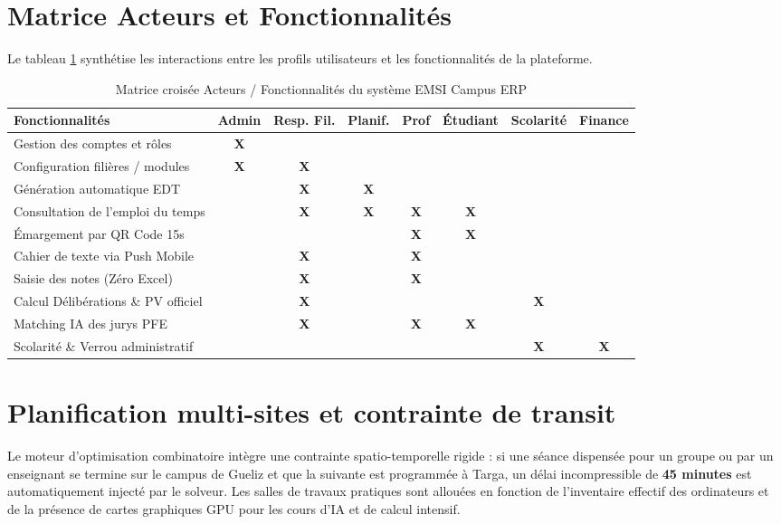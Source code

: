 \documentclass[11pt,a4paper]{report}
\begin{document}
\section{Matrice Acteurs et Fonctionnalités}
Le tableau \ref{tab:acteurs_fonctions} synthétise les interactions entre les profils utilisateurs et les fonctionnalités de la plateforme.

\begin{table}[h!]
\centering
\small
\renewcommand{\arraystretch}{1.3}
\begin{tabularx}{\textwidth}{|X|c|c|c|c|c|c|c|}
\hline
\rowcolor{tableheader}
\textbf{Fonctionnalités} & \textbf{Admin} & \textbf{Resp. Fil.} & \textbf{Planif.} & \textbf{Prof} & \textbf{Étudiant} & \textbf{Scolarité} & \textbf{Finance} \\
\hline
Gestion des comptes et rôles & \textbf{X} & & & & & & \\
\hline
Configuration filières / modules & \textbf{X} & \textbf{X} & & & & & \\
\hline
Génération automatique EDT & & \textbf{X} & \textbf{X} & & & & \\
\hline
Consultation de l'emploi du temps & & \textbf{X} & \textbf{X} & \textbf{X} & \textbf{X} & & \\
\hline
Émargement par QR Code 15s & & & & \textbf{X} & \textbf{X} & & \\
\hline
Cahier de texte via Push Mobile & & \textbf{X} & & \textbf{X} & & & \\
\hline
Saisie des notes (Zéro Excel) & & \textbf{X} & & \textbf{X} & & & \\
\hline
Calcul Délibérations \& PV officiel & & \textbf{X} & & & & \textbf{X} & \\
\hline
Matching IA des jurys PFE & & \textbf{X} & & \textbf{X} & \textbf{X} & & \\
\hline
Scolarité \& Verrou administratif & & & & & & \textbf{X} & \textbf{X} \\
\hline
\end{tabularx}
\caption{Matrice croisée Acteurs / Fonctionnalités du système EMSI Campus ERP}
\label{tab:acteurs_fonctions}
\end{table}

\section{Planification multi-sites et contrainte de transit}
Le moteur d'optimisation combinatoire intègre une contrainte spatio-temporelle rigide : si une séance dispensée pour un groupe ou par un enseignant se termine sur le campus de Gueliz et que la suivante est programmée à Targa, un délai incompressible de \textbf{45 minutes} est automatiquement injecté par le solveur. Les salles de travaux pratiques sont allouées en fonction de l'inventaire effectif des ordinateurs et de la présence de cartes graphiques GPU pour les cours d'IA et de calcul intensif.
\end{document}
